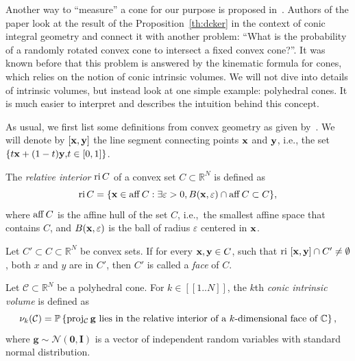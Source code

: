 Another way to ``measure'' a cone for our purpose is proposed in~\cite{livingontheedge}.
Authors of the paper look at the result of the Proposition~\ref{th:dcker} in the context of conic integral geometry
and connect it with another problem: ``What is the probability of a randomly rotated convex cone to intersect a fixed convex cone?''.
It was known before that this problem is answered by the kinematic formula for cones, which relies on the notion of conic intrinsic volumes.
We will not dive into details of intrinsic volumes, but instead look at one simple example: polyhedral cones.
It is much easier to interpret and describes the intuition behind this concept.

As usual, we first list some definitions from convex geometry as given by~\cite{rockafellar}.
We will denote by $[\mathbf{x}, \mathbf{y}]$ the line segment connecting points $\mathbf{x}$ and $\mathbf{y}$, i.e., the set $\{{t\mathbf{x} + (1-t)\mathbf{y},} \\ {t \in [0, 1]} \}$.

\begin{definition}
    The \textit{relative interior} $\operatorname{ri} C$ of a convex set $C \subset \mathbb{R}^N$ is defined as
    \[ \operatorname{ri} C = \{ \mathbf{x} \in \operatorname{aff} C: \exists \varepsilon>0, B(\mathbf{x}, \varepsilon) \cap \operatorname{aff} C \subset C \},\]
    where $\operatorname{aff} C$ is the affine hull of the set $C$, i.e.,\ the smallest affine space that contains $C$,
    and $B(\mathbf{x}, \varepsilon)$ is the ball of radius $\varepsilon$ centered in $\mathbf{x}$.
\end{definition}

\begin{definition}
    Let $C' \subset C \subset \mathbb{R}^N$ be convex sets.
    If for every $\mathbf{x}, \mathbf{y} \in C$, such that $\operatorname{ri}~[\mathbf{x}, \mathbf{y} ] \cap C' \neq \emptyset$, both $x$ and $y$ are in $C'$,
    then $C'$ is called a \textit{face} of $C$.
\end{definition}

\begin{definition}
    Let $\mathcal{C} \subset \mathbb{R}^N$ be a polyhedral cone.
    For $k \in [\![ 1..N ]\!]$, the $k$th \textit{conic intrinsic volume} is defined as
    \[ \nu_k(\mathcal{C}) = \mathbb{P} \left\{ \operatorname{proj_\mathcal{C}} \mathbf{g} \text{ lies in the relative interior
    of a $k$-dimensional face of $\mathbb{C}$} \right\}, \]
    where $\mathbf{g} \sim \mathcal{N}(\mathbf{0}, \mathbf{I})$ is a vector of independent random variables with standard normal distribution.
\end{definition}

